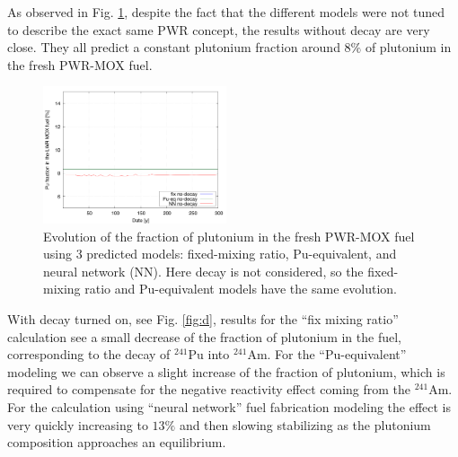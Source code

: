 \documentclass{anstrans}
\begin{document}
As observed in Fig. \ref{fig:nod}, despite the fact that the different models 
were not tuned to
describe the exact same PWR concept, the results without decay are very
close. They all predict a constant plutonium fraction around $8\%$ of plutonium
in the fresh PWR-MOX fuel.

\begin{figure}[ht] %
  \centering
  \includegraphics[width=0.48\textwidth]{nodecay_pu_contribution.png}
  \caption{Evolution of the fraction of plutonium in the fresh PWR-MOX fuel
    using 3 predicted models: fixed-mixing ratio, Pu-equivalent, and neural
    network (NN). Here decay is not considered, so the fixed-mixing ratio and Pu-equivalent models have the same evolution.}
  \label{fig:nod}
\end{figure}


With decay turned on, see Fig. \ref{fig:d}, results for the ``fix mixing ratio''
calculation see a small decrease of the fraction of plutonium in the fuel,
corresponding to the decay of $^{241}$Pu into $^{241}$Am.  For the
``Pu-equivalent'' modeling we can observe a slight increase of the fraction of
plutonium, which is required to compensate for the negative reactivity effect
coming from the $^{241}$Am. For the calculation using ``neural network'' fuel
fabrication modeling the effect is very quickly increasing to $13\%$ and then
slowing stabilizing as the plutonium composition approaches an equilibrium.
\end{document}
